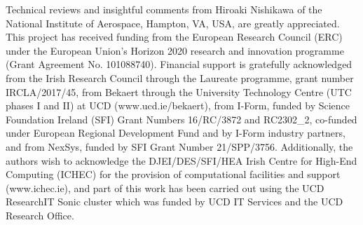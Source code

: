 \documentclass[sn-mathphys,Numbered]{sn-jnl}%
\begin{document}
\backmatter

Technical reviews and insightful comments from Hiroaki Nishikawa of the National Institute of Aerospace, Hampton, VA, USA, are greatly appreciated.
This project has received funding from the European Research Council (ERC) under the European Union’s Horizon 2020 research and innovation programme (Grant Agreement No. 101088740).
Financial support is gratefully acknowledged from the Irish Research Council through the Laureate programme, grant number IRCLA/2017/45, from Bekaert through the University Technology Centre (UTC phases I and II) at UCD (www.ucd.ie/bekaert), from I-Form, funded by Science Foundation Ireland (SFI) Grant Numbers 16/RC/3872 and {RC2302\_2}, co-funded under European Regional Development Fund and by I-Form industry partners, and from NexSys, funded by SFI Grant Number 21/SPP/3756.
Additionally, the authors wish to acknowledge the DJEI/DES/SFI/HEA Irish Centre for High-End Computing (ICHEC) for the provision of computational facilities and support (www.ichec.ie), and part of this work has been carried out using the UCD ResearchIT Sonic cluster which was funded by UCD IT Services and the UCD Research Office.



\newpage
\end{document}
